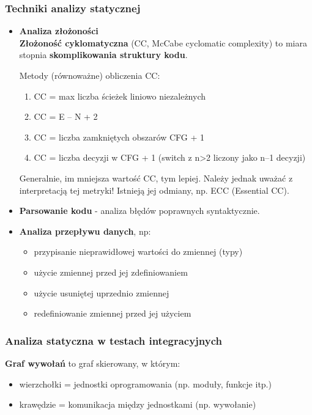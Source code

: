 \documentclass[../main.tex]{subfiles}
\begin{document}
    \subsubsection{Techniki analizy statycznej}
    \begin{itemize}
        \item \textbf{Analiza złożoności}\\
        \textbf{Złożoność cyklomatyczna} (CC, McCabe cyclomatic complexity) to miara stopnia \textbf{skomplikowania struktury kodu}.

        Metody (równoważne) obliczenia CC:
        \begin{enumerate}
            \item CC = max liczba ścieżek liniowo niezależnych
            \item CC = E – N + 2
            \item CC = liczba zamkniętych obszarów CFG + 1
            \item CC = liczba decyzji w CFG + 1
            (switch z n>2 liczony jako n–1 decyzji)
        \end{enumerate}
        Generalnie, im mniejsza wartość CC, tym lepiej. Należy jednak uważać z interpretacją tej metryki!
        Istnieją jej odmiany, np. ECC (Essential CC).

        \item \textbf{Parsowanie kodu} - analiza błędów poprawnych syntaktycznie.
        \item \textbf{Analiza przepływu danych}, np:
        \begin{itemize}
            \item przypisanie nieprawidłowej wartości do zmiennej (typy)
            \item użycie zmiennej przed jej zdefiniowaniem
            \item użycie usuniętej uprzednio zmiennej
            \item redefiniowanie zmiennej przed jej użyciem
        \end{itemize}
    \end{itemize}

    \subsubsection{Analiza statyczna w testach integracyjnych}
    \textbf{Graf wywołań} to graf skierowany, w którym:
    \begin{itemize}
        \item wierzchołki = jednostki oprogramowania (np. moduły, funkcje itp.)
        \item krawędzie = komunikacja między jednostkami (np. wywołanie)
    \end{itemize}
\end{document}
